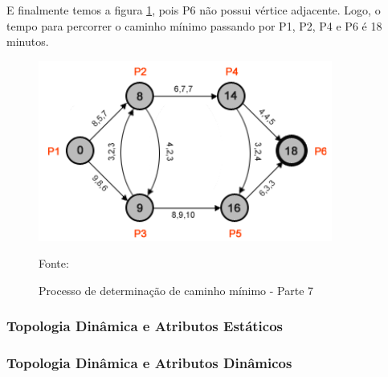 E finalmente temos a figura \ref{fig:leo8}, pois P6 não possui vértice adjacente. Logo, o 
tempo para percorrer o caminho mínimo passando por P1, P2, P4 e P6 é 18 minutos.

\begin{figure}[htbp]
\centering
 \includegraphics[width=.50\textwidth]{chapters/fig/leo8.png}
\caption{Processo de determinação de caminho mínimo - Parte 7}
Fonte: \cite{leonard}
\label{fig:leo8}
\end{figure}
\FloatBarrier

\subsubsection{Topologia Dinâmica e Atributos Estáticos}

\subsubsection{Topologia Dinâmica e Atributos Dinâmicos}



























